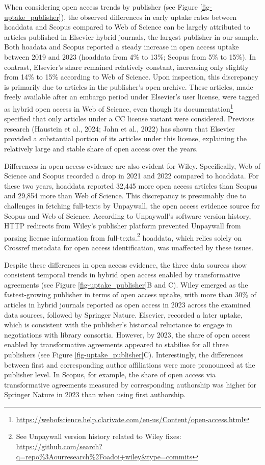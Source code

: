 \documentclass[a4paper,man,floatsintext,longtable,noextraspace,10pt]{apa6}
\begin{document}
When considering open access trends by publisher (see Figure
\ref{fig-uptake_publisher}), the observed differences in early uptake
rates between hoaddata and Scopus compared to Web of Science can be
largely attributed to articles published in Elsevier hybrid journals,
the largest publisher in our sample. Both hoadata and Scopus reported a
steady increase in open access uptake between 2019 and 2023 (hoaddata
from 4\% to 13\%; Scopus from 5\% to 15\%). In contrast, Elsevier's
share remained relatively constant, increasing only slightly from 14\%
to 15\% according to Web of Science. Upon inspection, this discrepancy
is primarily due to articles in the publisher's open archive. These
articles, made freely available after an embargo period under Elsevier's
user license, were tagged as hybrid open access in Web of Science, even
though its documentation\footnote{\url{https://webofscience.help.clarivate.com/en-us/Content/open-access.html}}
specified that only articles under a CC license variant were considered.
Previous research (Haustein et al., 2024; Jahn et al., 2022) has shown
that Elsevier provided a substantial portion of its articles under this
license, explaining the relatively large and stable share of open access
over the years.

Differences in open access evidence are also evident for Wiley.
Specifically, Web of Science and Scopus recorded a drop in 2021 and 2022
compared to hoaddata. For these two years, hoaddata reported 32,445 more
open access articles than Scopus and 29,854 more than Web of Science.
This discrepancy is presumably due to challenges in fetching full-texts
by Unpaywall, the open access evidence source for Scopus and Web of
Science. According to Unpaywall's software version history, HTTP
redirects from Wiley's publisher platform prevented Unpaywall from
parsing license information from full-texts.\footnote{See Unpaywall
  version history related to Wiley fixes:
  \url{https://github.com/search?q=repo\%3Aourresearch\%2Foadoi+wiley&type=commits}}
hoaddata, which relies solely on Crossref metadata for open access
identification, was unaffected by these issues.

Despite these differences in open access evidence, the three data
sources show consistent temporal trends in hybrid open access enabled by
transformative agreements (see Figure \ref{fig-uptake_publisher}B and
C). Wiley emerged as the fastest-growing publisher in terms of open
access uptake, with more than 30\% of articles in hybrid journals
reported as open access in 2023 across the examined data sources,
followed by Springer Nature. Elsevier, recorded a later uptake, which is
consistent with the publisher's historical reluctance to engage in
negotiations with library consortia. However, by 2023, the share of open
access enabled by transformative agreements appeared to stabilise for
all three publishers (see Figure \ref{fig-uptake_publisher}C).
Interestingly, the differences between first and corresponding author
affiliations were more pronounced at the publisher level. In Scopus, for
example, the share of open access via transformative agreements measured
by corresponding authorship was higher for Springer Nature in 2023 than
when using first authorship.
\end{document}
